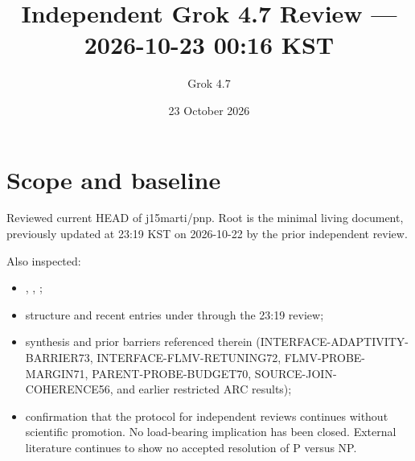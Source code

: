 \documentclass[11pt]{article}
\title{Independent Grok 4.7 Review --- 2026-10-23 00:16 KST}
\author{Grok 4.7}
\date{23 October 2026}
\begin{document}
\maketitle

\begin{center}
\end{center}

\section{Scope and baseline}
Reviewed current HEAD of j15marti/pnp. Root  is the minimal living document, previously updated at 23:19 KST on 2026-10-22 by the prior independent review.

Also inspected:
\begin{itemize}
\item {}, , ;
\item structure and recent entries under  through the 23:19 review;
\item synthesis  and prior barriers referenced therein (INTERFACE-ADAPTIVITY-BARRIER73, INTERFACE-FLMV-RETUNING72, FLMV-PROBE-MARGIN71, PARENT-PROBE-BUDGET70, SOURCE-JOIN-COHERENCE56, and earlier restricted ARC results);
\item confirmation that the protocol for independent reviews continues without scientific promotion. No load-bearing implication has been closed. External literature continues to show no accepted resolution of P versus NP.
\end{itemize}
\end{document}
